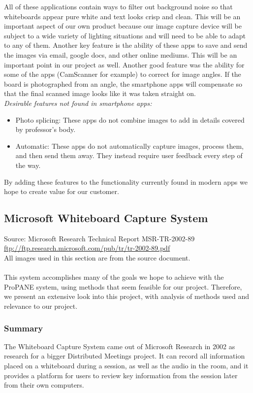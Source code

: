 \documentclass{article}
\begin{document}
All of these applications contain ways to filter out background noise so that whiteboards appear pure white and text looks crisp and clean. This will be an important aspect of our own product because our image capture device will be subject to a wide variety of lighting situations and will need to be able to adapt to any of them.
Another key feature is the ability of these apps to save and send the images via email, google docs, and other online mediums. This will be an important point in our project as well.
Another good feature was the ability for some of the apps (CamScanner for example) to correct for image angles. If the board is photographed from an angle, the smartphone apps will compensate so that the final scanned image looks like it was taken straight on. \\

        \emph{Desirable features not found in smartphone apps:}
        \begin{itemize} \itemsep -2pt
            \item Photo splicing: These apps do not combine images to add in details covered by professor's body.
            \item Automatic: These apps do not automatically capture images, process them, and then send them away. They instead require user feedback every step of the way.
        \end{itemize}

By adding these features to the functionality currently found in modern apps we hope to create value for our customer.


			\subsection*{Microsoft Whiteboard Capture System}
Source: Microsoft Research Technical Report MSR-TR-2002-89 \\
{\color{red} \url{ftp://ftp.research.microsoft.com/pub/tr/tr-2002-89.pdf}} \\
All images used in this section are from the source document. \\ \\
This system accomplishes many of the goals we hope to achieve with the ProPANE system, using methods that seem feasible for our project.  Therefore, we present an extensive look into this project, with analysis of methods used and relevance to our project.
		\subsubsection*{Summary}
The Whiteboard Capture System came out of Microsoft Research in 2002 as research for a bigger Distributed Meetings project.  It can record all information placed on a whiteboard during a session, as well as the audio in the room, and it provides a platform for users to review key information from the session later from their own computers.  
	
\end{document}
